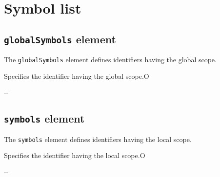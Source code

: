\section{Symbol list}

\subsection{ {\tt globalSymbols} element}

The {\tt globalSymbols} element defines identifiers having the global scope.


\begin{XcodeMLChildElements}
{Specifies the identifier having the global scope.}{O}
\end{XcodeMLChildElements}

\begin{XcodeMLAttributes}
\XcodeMLAttrDef{-}{-}
{-}{-}
\end{XcodeMLAttributes}

\subsection{ {\tt symbols} element}

The {\tt symbols} element defines identifiers having the local scope.


\begin{XcodeMLChildElements}
{Specifies the identifier having the local scope.}{O}
\end{XcodeMLChildElements}

\begin{XcodeMLAttributes}
\XcodeMLAttrDef{-}{-}
{-}{-}
\end{XcodeMLAttributes}


